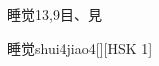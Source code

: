 \begin{entry}{睡觉}{13,9}{⽬、⾒}
  \begin{phonetics}{睡觉}{shui4jiao4}[][HSK 1]
  \end{phonetics}
\end{entry}
